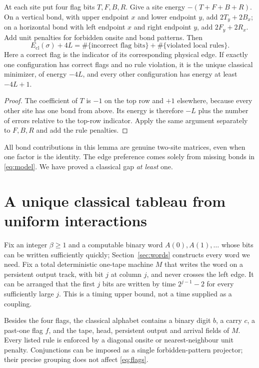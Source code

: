 \begin{lemma}\label{lem:boundary}
At each site put four flag bits $T,F,B,R$. Give a site energy
$-(T+F+B+R)$. On a vertical bond, with upper endpoint $x$ and lower
endpoint $y$, add $2T_y+2B_x$; on a horizontal bond with left endpoint
$x$ and right endpoint $y$, add $2F_y+2R_x$. Add unit penalties for
forbidden onsite and bond patterns. Then
\begin{equation}\label{eq:flags}
 E_{\mathrm{cl}}(\sigma)+4L
 =\#\{\text{incorrect flag bits}\}+\#\{\text{violated local rules}\}.
\end{equation}
Here a correct flag is the indicator of its corresponding physical edge.
If exactly one configuration has correct flags and no rule violation, it
is the unique classical minimizer, of energy $-4L$, and every other
configuration has energy at least $-4L+1$.
\end{lemma}
\begin{proof}
The coefficient of $T$ is $-1$ on the top row and $+1$ elsewhere,
because every other site has one bond from above. Its energy is therefore
$-L$ plus the number of errors relative to the top-row indicator.
Apply the same argument separately to $F,B,R$ and add the rule penalties.
\end{proof}
All bond contributions in this lemma are genuine two-site matrices, even
when one factor is the identity. The edge preference comes solely from
missing bonds in \eqref{eq:model}. We have proved a classical gap
\emph{at least} one.

\section{A unique classical tableau from uniform interactions}\label{sec:classical}
Fix an integer $\beta\geq1$ and a computable binary word $A(0),A(1),\ldots$
whose bits can be written sufficiently quickly; Section~\ref{sec:words}
constructs every word we need. Fix a total deterministic one-tape machine
$M$ that writes the word on a persistent output track, with bit $j$ at
column $j$, and never crosses the left edge. It can be arranged that the
first $j$ bits are written by time $2^{j-1}-2$ for every sufficiently large
$j$. This is a timing upper bound, not a time supplied as a coupling.

Besides the four flags, the classical alphabet contains a binary digit
$b$, a carry $c$, a past-one flag $f$, and the tape, head, persistent output
and arrival fields of $M$. Every listed rule is enforced by a diagonal
onsite or nearest-neighbour unit penalty. Conjunctions can be imposed as
a single forbidden-pattern projector; their precise grouping does not
affect \eqref{eq:flags}.

